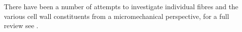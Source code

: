 There have been a number of attempts to investigate individual fibres and the  various cell wall constituents from a micromechanical perspective, for a full review see \citet{Eder_2012}.